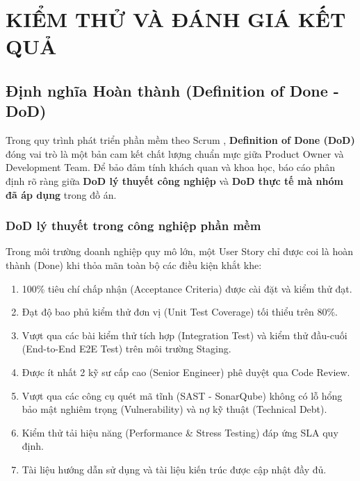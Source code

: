 \chapter{KIỂM THỬ VÀ ĐÁNH GIÁ KẾT QUẢ}
\label{chap:kiem-thu-danh-gia}

\section{Định nghĩa Hoàn thành (Definition of Done - DoD)}
\label{sec:dod}

Trong quy trình phát triển phần mềm theo Scrum \cite{scrumguide2020}, \textbf{Definition of Done (DoD)} đóng vai trò là một bản cam kết chất lượng chuẩn mực giữa Product Owner và Development Team. Để bảo đảm tính khách quan và khoa học, báo cáo phân định rõ ràng giữa \textbf{DoD lý thuyết công nghiệp} và \textbf{DoD thực tế mà nhóm đã áp dụng} trong đồ án.

\subsection{DoD lý thuyết trong công nghiệp phần mềm}
Trong môi trường doanh nghiệp quy mô lớn, một User Story chỉ được coi là hoàn thành (Done) khi thỏa mãn toàn bộ các điều kiện khắt khe:
\begin{enumerate}
    \item 100\% tiêu chí chấp nhận (Acceptance Criteria) được cài đặt và kiểm thử đạt.
    \item Đạt độ bao phủ kiểm thử đơn vị (Unit Test Coverage) tối thiểu trên 80\%.
    \item Vượt qua các bài kiểm thử tích hợp (Integration Test) và kiểm thử đầu-cuối (End-to-End E2E Test) trên môi trường Staging.
    \item Được ít nhất 2 kỹ sư cấp cao (Senior Engineer) phê duyệt qua Code Review.
    \item Vượt qua các công cụ quét mã tĩnh (SAST - SonarQube) không có lỗ hổng bảo mật nghiêm trọng (Vulnerability) và nợ kỹ thuật (Technical Debt).
    \item Kiểm thử tải hiệu năng (Performance \& Stress Testing) đáp ứng SLA quy định.
    \item Tài liệu hướng dẫn sử dụng và tài liệu kiến trúc được cập nhật đầy đủ.
\end{enumerate}

